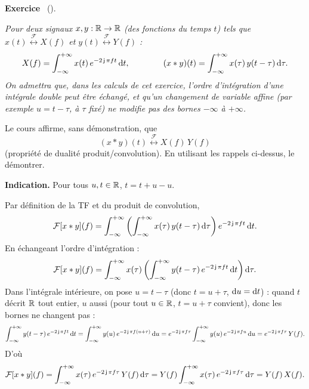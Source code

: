 \documentclass[a4paper,11pt]{article}
\title{\chapterTitle}
\author{}
\date{}
\makeatletter
\theoremstyle{definition}
\renewcommand\maketitle{{\raggedright\begin{center}
    {\Huge\bfseries\@title}
\end{center}}}
\newcounter{exercice}   %
\newenvironment{exercice}[1][]{%
  \refstepcounter{exercice}%
  \par\noindent\textbf{Exercice \theexercice}\if\relax\detokenize{#1}\relax\else\ (#1)\fi.\par\noindent\ignorespaces
}{\par}
\makeatother
\begin{document}
\selectfont
\fontsize{12pt}{14pt}\selectfont

\maketitle
\thispagestyle{fancy}
\setcounter{exercice}{0}


\begin{exercice}
    \label{ex:dualite-conv}

    \textit{Pour deux signaux $x,y:{\mathbb{R}}\to{\mathbb{R}}$ (des fonctions du temps $t$) tels que $x(t)\overset{\mathcal F}{\longleftrightarrow}X(f)$ et $y(t)\overset{\mathcal F}{\longleftrightarrow}Y(f)$ :
    $$
        X(f) = \int_{-\infty}^{+\infty} x(t)\,e^{-2\operatorname{\mathsf{j}}\pi ft}\,{\rm d} t, \qquad\qquad (x*y)(t) = \int_{-\infty}^{+\infty} x(\tau)\,y(t-\tau)\,{\rm d}\tau.
    $$
    On admettra que, dans les calculs de cet exercice, l'ordre d'intégration d'une intégrale double peut être échangé, et qu'un changement de variable affine (par exemple $u=t-\tau$, à $\tau$ fixé) ne modifie pas des bornes $-\infty$ à $+\infty$.
    }

    \bigskip
    Le cours affirme, sans démonstration, que
    $$
    (x*y)(t) \overset{\mathcal F}{\longleftrightarrow} X(f)\,Y(f)
    $$
    (propriété de dualité produit/convolution). En utilisant les rappels ci-dessus, le démontrer.

    \medskip
    \noindent\textbf{Indication.} Pour tous $u,t\in{\mathbb{R}}$, $t = t+u-u$.
    \begin{solution}
        Par définition de la TF et du produit de convolution,
        $$
            \mathcal F[x*y](f) = \int_{-\infty}^{+\infty}\left(\int_{-\infty}^{+\infty} x(\tau)\,y(t-\tau)\,{\rm d}\tau\right) e^{-2\operatorname{\mathsf{j}}\pi ft}\,{\rm d} t.
        $$
        En échangeant l'ordre d'intégration :
        $$
            \mathcal F[x*y](f) = \int_{-\infty}^{+\infty} x(\tau) \left(\int_{-\infty}^{+\infty} y(t-\tau)\,e^{-2\operatorname{\mathsf{j}}\pi ft}\,{\rm d} t\right) {\rm d}\tau.
        $$
        Dans l'intégrale intérieure, on pose $u=t-\tau$ (donc $t=u+\tau$, ${\rm d} u={\rm d} t$) : quand $t$ décrit ${\mathbb{R}}$ tout entier, $u$ aussi (pour tout $u\in{\mathbb{R}}$, $t=u+\tau$ convient), donc les bornes ne changent pas :
        $$
            \int_{-\infty}^{+\infty} y(t-\tau)\,e^{-2\operatorname{\mathsf{j}}\pi ft}\,{\rm d} t = \int_{-\infty}^{+\infty} y(u)\,e^{-2\operatorname{\mathsf{j}}\pi f(u+\tau)}\,{\rm d} u = e^{-2\operatorname{\mathsf{j}}\pi f\tau}\int_{-\infty}^{+\infty} y(u)\,e^{-2\operatorname{\mathsf{j}}\pi fu}\,{\rm d} u = e^{-2\operatorname{\mathsf{j}}\pi f\tau}\,Y(f).
        $$
        D'où
        $$
            \mathcal F[x*y](f) = \int_{-\infty}^{+\infty} x(\tau)\,e^{-2\operatorname{\mathsf{j}}\pi f\tau}\,Y(f)\,{\rm d}\tau = Y(f)\int_{-\infty}^{+\infty} x(\tau)\,e^{-2\operatorname{\mathsf{j}}\pi f\tau}\,{\rm d}\tau = Y(f)\,X(f).
        $$
    \end{solution}
\end{exercice}
\end{document}
